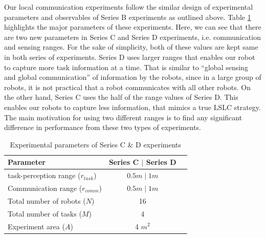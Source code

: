 \documentclass[final,5p,times,twocolumn]{elsarticle}
\begin{document}
Our local communication experiments follow the similar design of experimental parameters and observables of Series B experiments as outlined above. Table \ref{table:local-expt-design} highlights the major parameters of these experiments. Here, we can see that there are two new parameters in Series C and Series D experiments, i.e. communication and sensing ranges. For the sake of simplicity, both of these values are kept same in both series of experiments.
Series D uses larger ranges that enables our robot to capture more task information at a time. That is similar to  ``global sensing and global communication'' of information by the robots, since in a large group of robots, it is not practical that a robot communicates with all other robots. On the other hand, Series C uses the half of the range values of Series D. This enables our robots to capture less information, that mimics a true LSLC strategy. The main motivation for using two different ranges is to find any significant difference in performance from these two types of experiments.
\begin{table}
\caption{Experimental parameters of Series C \& D experiments}
\label{table:local-expt-design}
\begin{center}
\begin{tabular}{|l|c|c|}
\hline Parameter & \hspace*{0.2cm} Series C $\mid$ Series D\\
\hline task-perception range ($r_{task}$) & $0.5 m \mid 1 m$\\
\hline Communication range ($r_{comm}$) & $0.5 m \mid 1 m$\\
\hline Total number of robots ($N$) & 16 \\
\hline Total number of tasks ($M$) & 4 \\
\hline Experiment area ($A$) & 4 $m^2$\\
\hline
\end{tabular}
\end{center}
\end{table}
% 
\end{document}
